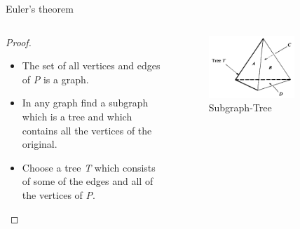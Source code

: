 \documentclass{beamer}
\begin{document}
\begin{frame}{Euler's theorem}
\begin{columns}
\begin{column}{0.5\textwidth}
  \begin{proof}
    \begin{itemize}
    \item The set of all vertices and edges of \textsl{P} is a graph.
    \item In any graph find a subgraph which is a tree and which contains all the vertices of the original.
    \item Choose a tree \textsl{T} which consists of some of the edges and all of the vertices of \textsl{P}.
    \end{itemize}
  \end{proof}
\end{column}
\begin{column}{0.5\textwidth}
    \begin{figure}
    \centering
        \includegraphics[width=0.7\textwidth]{figure_1_5_a.png}
        \caption{Subgraph-Tree}
    \end{figure}
\end{column}
\end{columns}
\end{frame}
\end{document}

